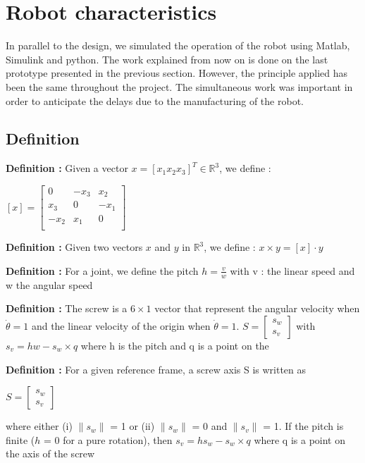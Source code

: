 \section{Robot characteristics}\insertloftspace
\setcounter{figure}{0}\setcounter{table}{0}

In parallel to the design, we simulated the operation of the robot using Matlab, Simulink and python. The work explained from now on is done on the last prototype presented in the previous section. However, the principle applied has been the same throughout the project. The simultaneous work was important in order to anticipate the delays due to the manufacturing of the robot. 

\subsection{Definition}

\textbf{Definition :} Given a vector $x=[x_1 x_2 x_3]^T \in \mathbb{R}^3$, we define : 
\begin{center}
    $[x] = \begin{bmatrix}
        0 & -x_3 & x_2 \\
        x_3 & 0 & -x_1 \\
        -x_2 & x_1 & 0 \\
    \end{bmatrix}$
\end{center}

\noindent\textbf{Definition :} Given two vectors $x$ and $y$ in $\mathbb{R}^3$, we define : $x\times y = [x]\cdot y$

\bigbreak
\noindent\textbf{Definition :} For a joint, we define the pitch $h = \frac{v}{w}$ with v : the linear speed and w the angular speed

\bigbreak
\noindent\textbf{Definition :} The screw is a $6\times1$ vector that represent the angular velocity when $\dot{\theta}=1$ and the linear velocity of the origin when $\dot{\theta}=1$. $S = \begin{bmatrix} s_w\\s_v\end{bmatrix}$ with $s_v = hw-s_w\times q$ where h is the pitch and q is a point on the 

\noindent\textbf{Definition :} For a given reference frame, a screw axis S is written as 
\begin{center}
    $S=\begin{bmatrix}
        s_w\\s_v
    \end{bmatrix}$
\end{center}
where either (i) $\|s_w\|$ = 1 or (ii) $\|s_w\|$ = 0 and $\|s_v\|$ = 1. If the pitch is finite ($h$ = 0 for a pure rotation), then $s_v = hs_w-s_w\times q$ where q is a point on the axis of the screw

